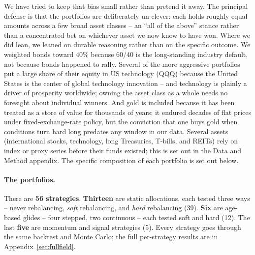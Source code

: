\documentclass[11pt]{article}
\begin{document}
We have tried to keep that bias small rather than pretend it away. The principal defense is that the
portfolios are deliberately un-clever: each holds roughly equal amounts across a few broad asset classes
-- an ``all of the above'' stance rather than a concentrated bet on whichever asset we now know to have
won. Where we did lean, we leaned on durable reasoning rather than on the specific outcome. We weighted
bonds toward 40\% because 60/40 is the long-standing industry default, not because bonds happened to
rally. Several of the more aggressive portfolios put a large share of their equity in US technology (QQQ) because
the United States is the center of global technology innovation -- and technology is plainly a driver of
prosperity worldwide; owning the asset class as a whole needs no foresight about individual winners. And
gold is included because it has been treated as a store of value for thousands of years; it endured
decades of flat prices under fixed-exchange-rate policy, but the conviction that one buys gold when
conditions turn hard long predates any window in our data. Several assets (international stocks, technology,
long Treasuries, T-bills, and REITs) rely on index or proxy series before their funds existed; this is
set out in the Data and Method appendix. The specific composition of each portfolio is set out below.

\paragraph{The portfolios.} There are \textbf{56 strategies}. \textbf{Thirteen} are static allocations,
each tested three ways -- never rebalancing, \emph{soft} rebalancing, and \emph{hard} rebalancing (39).
\textbf{Six} are age-based glides -- four stepped, two continuous -- each tested soft and hard (12).
The last \textbf{five} are momentum and signal strategies (5). Every strategy goes through the same
backtest and Monte Carlo; the full per-strategy results are in Appendix~\ref{sec:fullfield}.
\end{document}
